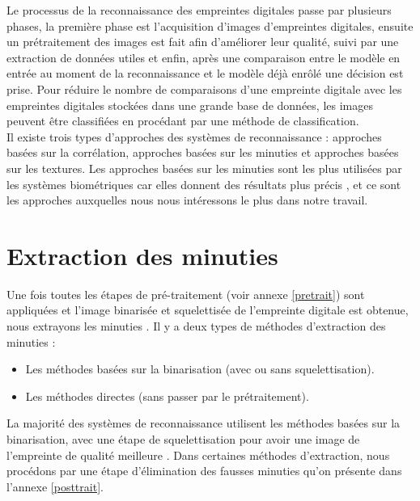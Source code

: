 \clearpage
Le processus de la reconnaissance des empreintes digitales passe par plusieurs phases, la première phase est l'acquisition d'images d'empreintes digitales, ensuite un prétraitement des images est fait afin d'améliorer leur qualité, suivi par une extraction de données utiles et enfin, après une comparaison entre le modèle en entrée au moment de la reconnaissance et le modèle déjà enrôlé une décision est prise. Pour réduire le nombre de comparaisons d'une empreinte digitale avec les empreintes digitales stockées dans une grande base de données, les images peuvent être classifiées en procédant par une méthode de classification.
\\
Il existe trois types d'approches des systèmes de reconnaissance : approches basées sur la corrélation, approches basées sur les minuties et approches basées sur les textures. 
Les approches basées sur les minuties sont les plus utilisées par les systèmes biométriques \citep{jiang2000fingerprint} car elles donnent des résultats plus précis \citep{o1998overview}, et ce sont les approches auxquelles nous nous intéressons le plus dans notre travail. 

\section{Extraction des minuties}
Une fois toutes les étapes de pré-traitement (voir annexe \ref{pretrait}) sont appliquées et l'image binarisée et squelettisée de l'empreinte digitale est obtenue, nous extrayons les minuties \citep{tisse2001systeme}. Il y a deux types de méthodes d'extraction des minuties : 
\begin{itemize}
	\item Les méthodes basées sur la binarisation (avec ou sans squelettisation).
	\item Les méthodes directes (sans passer par le prétraitement).
\end{itemize}
La majorité des systèmes de reconnaissance utilisent les méthodes basées sur la binarisation, avec une étape de squelettisation pour avoir une image de l'empreinte de qualité meilleure \citep{bansal2011minutiae}. Dans certaines méthodes d'extraction, nous procédons par une étape d'élimination des fausses minuties qu'on présente dans l'annexe \ref{posttrait}.
